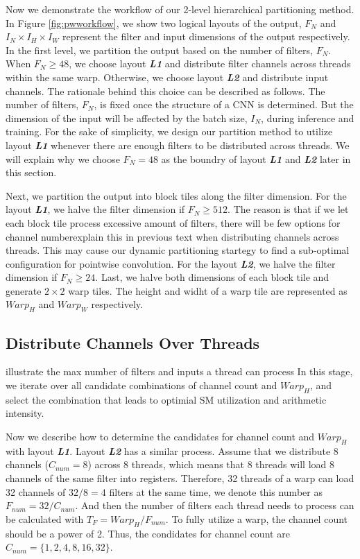 Now we demonstrate the workflow of our 2-level hierarchical partitioning method.
In Figure \ref{fig:pwworkflow}, we show two logical layouts of the output, $F_N$ and $I_N \times I_H \times I_W$ represent the filter and input dimensions of the output respectively.
In the first level, we partition the output based on the number of filters, $F_N$.
When $F_N \ge 48$, we choose layout \textbf{\emph{L1}} and distribute filter channels across threads within the same warp. 
Otherwise, we choose layout \textbf{\emph{L2}} and distribute input channels.
The rationale behind this choice can be described as follows. 
The number of filters, $F_N$, is fixed once the structure of a CNN is determined. 
But the dimension of the input will be affected by the batch size, $I_N$, during inference and training.
For the sake of simplicity, we design our partition method to utilize layout \textbf{\emph{L1}} whenever there are enough filters to be distributed across threads.
We will explain why we choose $F_N=48$ as the boundry of layout \textbf{\emph{L1}} and \textbf{\emph{L2}} later in this section.

Next, we partition the output into block tiles along the filter dimension. 
For the layout \textbf{\emph{L1}}, we halve the filter dimension if $F_N \geq 512$. 
The reason is that if we let each block tile process excessive amount of filters, there will be few options for channel number{\color{red}explain this in previous text} when distributing channels across threads. 
This may cause our dynamic partitioning startegy to find a sub-optimal configuration for pointwise convolution.
For the layout \textbf{\emph{L2}}, we halve the filter dimension if $F_N \geq 24$.
Last, we halve both dimensions of each block tile and generate $2 \times 2$ warp tiles. The height and widht of a warp tile are represented as $Warp_H$ and $Warp_W$ respectively.

\subsection{Distribute Channels Over Threads}
{\color{red}illustrate the max number of filters and inputs a thread can process}
In this stage, we iterate over all candidate combinations of channel count and $Warp_H$, and select the combination that leads to optimial SM utilization and arithmetic intensity.

Now we describe how to determine the candidates for channel count and $Warp_H$ with layout \textbf{\emph{L1}}. Layout \textbf{\emph{L2}} has a similar process.
Assume that we distribute 8 channels ($C_{num}=8$) across 8 threads, which means that 8 threads will load 8 channels of the same filter into registers. 
Therefore, 32 threads of a warp can load 32 channels of $32/8=4$ filters at the same time, we denote this number as $F_{num}=32/C_{num}$.
And then the number of filters each thread needs to process can be calculated with $T_F=Warp_H/F_{num}$.
To fully utilize a warp, the channel count should be a power of 2.
Thus, the condidates for channel count are $C_{num}=\{1,2,4,8,16,32\}$.

